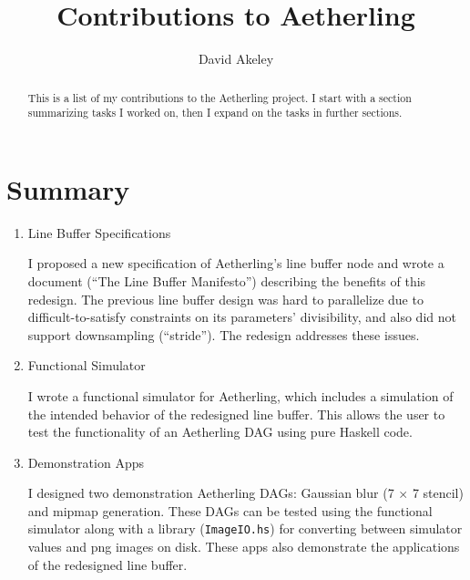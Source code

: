 \documentclass[11pt]{article}
\begin{document}
\title{Contributions to Aetherling}
\author{David Akeley}
\maketitle

\begin{abstract}
This is a list of my contributions to the Aetherling project. I start
with a section summarizing tasks I worked on, then I expand on the
tasks in further sections.
\end{abstract}

\section{Summary}

\begin{enumerate}

\item Line Buffer Specifications

I proposed a new specification of Aetherling's line buffer node and
wrote a document (``The Line Buffer Manifesto'') describing the
benefits of this redesign. The previous line buffer design was hard to
parallelize due to difficult-to-satisfy constraints on its parameters'
divisibility, and also did not support downsampling (``stride'').
The redesign addresses these issues.


\item Functional Simulator

I wrote a functional simulator for Aetherling, which includes a
simulation of the intended behavior of the redesigned line
buffer. This allows the user to test the functionality of an
Aetherling DAG using pure Haskell code.

\item Demonstration Apps

I designed two demonstration Aetherling DAGs: Gaussian blur (7 $\times$
7 stencil) and mipmap generation. These DAGs can be tested using the
functional simulator along with a library (\texttt{ImageIO.hs}) for
converting between simulator values and png images on disk. These apps
also demonstrate the applications of the redesigned line buffer.


\end{enumerate}
\end{document}

